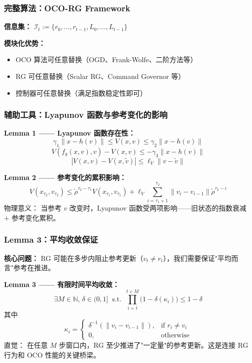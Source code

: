 \documentclass{ltx-talk}
\begin{document}
\begin{frame}[fragile]
\frametitle{完整算法：OCO-RG Framework}

\begin{algorithm}[H]
\caption{The OCO-RG Framework}
\end{algorithm}

\vspace{3mm}
\textbf{信息集：} $\mathcal{I}_t := \{r_0,\dots,r_{t-1}, L_0,\dots,L_{t-1}\}$

\textbf{模块化优势：}
\begin{itemize}
    \item OCO 算法可任意替换（OGD、Frank-Wolfe、二阶方法等）
    \item RG 可任意替换（Scalar RG、Command Governor 等）
    \item 控制器可任意替换（满足指数稳定性即可）
\end{itemize}
\end{frame}

\begin{frame}
\frametitle{辅助工具：Lyapunov 函数与参考变化的影响}

\textbf{Lemma 1 —— Lyapunov 函数存在性：}
\[
    \gamma_1\|x - h(v)\| \le V(x, v) \le \gamma_2\|x - h(v)\|
\]
\[
    V(f_g(x,v), v) - V(x,v) \le -\gamma_3\|x - h(v)\|
\]
\[
    |V(x,v) - V(x,\tilde{v})| \le \ell_V \|v - \tilde{v}\|
\]

\textbf{Lemma 2 —— 参考变化的累积影响：}
\[
    V(x_{\tau_2}, v_{\tau_2}) \le \tilde{\rho}^{\tau_2-\tau_1} V(x_{\tau_1}, v_{\tau_1}) + \ell_V \sum_{i=\tau_1+1}^{\tau_2} \|v_i - v_{i-1}\| \tilde{\rho}^{\tau_2-i}
\]
\small
\textcolor{myblue}{物理意义：} 当参考 $v$ 改变时，Lyapunov 函数受两项影响——旧状态的指数衰减 $+$ 参考变化累积。
\end{frame}

\begin{frame}
\frametitle{Lemma 3：平均收敛保证}

\textbf{核心问题：} RG 可能在多步内阻止参考更新（$v_t \neq r_t$），我们需要保证"平均而言"参考在推进。

\textbf{Lemma 3 —— 有限时间平均收敛：}
\[
    \exists M \in \mathbb{N},\, \delta \in (0,1] \;\; \text{s.t.} \;\; \prod_{i=t}^{t+M} \bigl(1 - \delta(\kappa_i)\bigr) \le 1 - \delta
\]
其中
\[
    \kappa_i = \begin{cases}
        \delta^{-1}(\|v_i - v_{i-1}\|), & \text{if } r_i \neq v_i \\
        0, & \text{otherwise}
    \end{cases}
\]
\small
\textcolor{myred}{直觉：} 在任意 $M$ 步窗口内，RG 至少推进了"一定量"的参考更新。这是连接 RG 行为和 OCO 性能的关键桥梁。
\end{frame}
\end{document}
